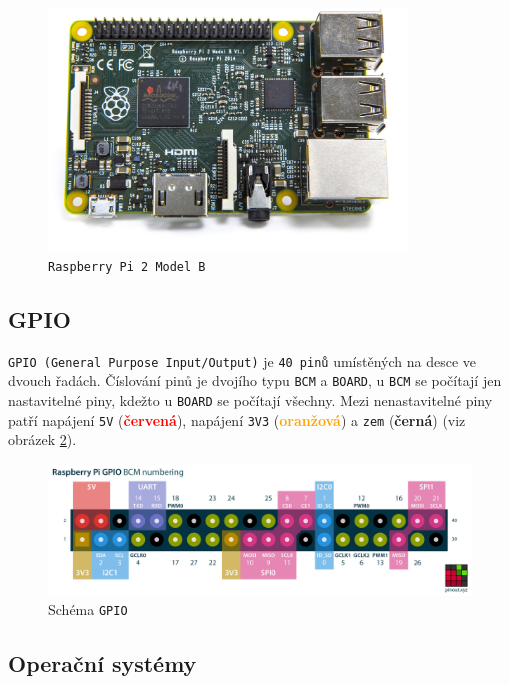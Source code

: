 \documentclass[czech,BP]{thesiskiv}
\begin{document}
		\begin{figure}[H]
		\centering
		\includegraphics[width=0.85\textwidth]{../images/rpi2.jpg}	
		\caption{\texttt{Raspberry Pi 2 Model B}}
		\label{fig:rpi2}
	\end{figure}
		
\newpage	

		\subsection{GPIO}
			\texttt{GPIO (General Purpose Input/Output)} je \texttt{40 pinů} umístěných na desce ve dvouch řadách. Číslování pinů je dvojího typu \texttt{BCM} a \texttt{BOARD}, u \texttt{BCM} se počítají jen nastavitelné piny, kdežto u \texttt{BOARD} se počítají všechny.
Mezi nenastavitelné piny patří napájení \texttt{5V} (\textcolor{red}{\textbf{červená}}), napájení \texttt{3V3} (\textcolor{orange}{\textbf{oranžová}}) a \texttt{zem} (\textbf{černá}) (viz obrázek \ref{fig:gpio}).	
		
		\begin{figure}[H]
   		 	\centering
			\includegraphics[width=1\textwidth]{../images/gpio.png}	
			\caption{Schéma \texttt{GPIO}}
    		\label{fig:gpio}
		\end{figure}		
		
		
		\subsection{Operační systémy}
\end{document}
